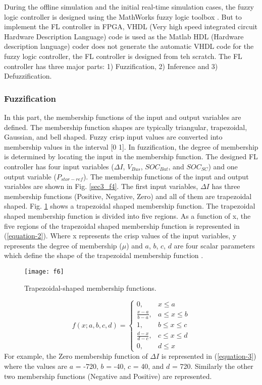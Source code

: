 During the offline simulation and the initial real-time simulation cases, the fuzzy logic controller is designed using the MathWorks fuzzy logic toolbox \cite{WinNT6}. But to implement the FL controller in FPGA, VHDL (Very high speed integrated circuit Hardware Description Language) code is used as the Matlab HDL (Hardware description language) coder does not generate the automatic VHDL code for the fuzzy logic controller, the FL controller is designed from teh scratch. The FL controller has three major parts: 1) Fuzzification, 2) Inference and 3) Defuzzification.

\subsubsection{Fuzzification}
In this part, the membership functions of the input and output variables are defined. The membership function shapes are typically triangular, trapezoidal, Gaussian, and bell shaped. Fuzzy crisp input values are converted into membership values in the interval [0 1]. In fuzzification, the degree of membership is determined by locating the input in the membership function. The designed FL controller has four input variables ($\Delta I$, $V_{Bus}$, $SOC_{Bat}$, and $SOC_{SC}$) and one output variable ($P_{stor-ref}$). The membership functions of the input and output variables are shown in Fig. \ref{sec3_f4}. The first input variables, $\Delta I$ has three membership functions (Positive, Negative, Zero) and all of them are trapezoidal shaped. Fig. \ref{sec4_f6} shows a trapezoidal shaped membership function. The trapezoidal shaped membership function is divided into five regions. As a function of x, the five regions of the trapezoidal shaped membership function is represented in (\ref{equation-2}). Where x represents the crisp values of the input variables, y represents the degree of membership ($\mu$) and $a$, $b$, $c$, $d$ are four scalar parameters which define the shape of the trapezoidal membership function \cite{anand2012design}.
\begin{figure}[ht!]
\centering
\texttt{[image: f6]}
\caption{Trapezoidal-shaped membership functions.}
\label{sec4_f6}
\end{figure} 
\begin{equation}\label{equation-2}
f(x;a,b,c,d)=
    \begin{cases}
      0, &  x\leq a\\
      \frac{x-a}{b-a}, & a\leq x \leq b \\
       1, & b\leq x \leq c \\
       \frac{d-x}{d-c}, & c\leq x \leq d \\
       0, &  d\leq x
    \end{cases}
\end{equation}
For example, the Zero membership function of $\Delta I$ is represented in (\ref{equation-3}) where the values are $a$ = -720, $b$ = -40, $c$ = 40, and $d$ = 720. Similarly the other two membership functions (Negative and Positive) are represented. 

